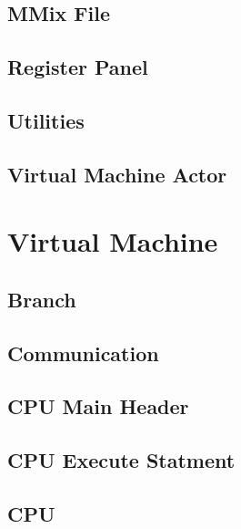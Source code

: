 \documentclass[a4paper,11pt]{report}
\begin{document}
\begin{appendices}
\subsection{MMix File}\label{source:mmix_file}

\subsection{Register Panel}\label{source:register_panel}

\subsection{Utilities}\label{source:utilities}

\subsection{Virtual Machine Actor}\label{source:vm_actor}

\section{Virtual Machine}
\subsection{Branch}\label{source:vm_branch}

\subsection{Communication}\label{source:vm_comm}

\subsection{CPU Main Header}\label{source:vm_cpu_header}

\subsection{CPU Execute Statment}\label{source:vm_cpu_execute}

\subsection{CPU}\label{source:vm_cpu}


\end{appendices}
\end{document}
